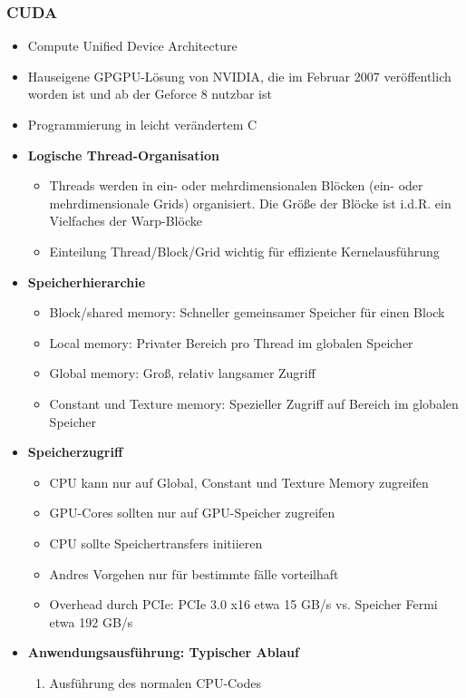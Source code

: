 \subsubsection{CUDA}
\begin{itemize}
	\item Compute Unified Device Architecture
	\item Hauseigene GPGPU-Lösung von NVIDIA, die im Februar 2007 veröffentlich worden ist und ab der Geforce 8 nutzbar ist
	\item Programmierung in leicht verändertem C
	\item \textbf{Logische Thread-Organisation}
	\begin{itemize}
		\item Threads werden in ein- oder mehrdimensionalen Blöcken (ein- oder mehrdimensionale Grids) organisiert. Die Größe der Blöcke ist i.d.R. ein Vielfaches der Warp-Blöcke
		\item Einteilung Thread/Block/Grid wichtig für effiziente Kernelausführung
	\end{itemize}
	\item \textbf{Speicherhierarchie}
	\begin{itemize}
		\item Block/shared memory: Schneller gemeinsamer Speicher für einen Block
		\item Local memory: Privater Bereich pro Thread im globalen Speicher
		\item Global memory: Groß, relativ langsamer Zugriff
		\item Constant und Texture memory: Spezieller Zugriff auf Bereich im globalen Speicher
	\end{itemize}
	\item \textbf{Speicherzugriff}
	\begin{itemize}
		\item CPU kann nur auf Global, Constant und Texture Memory zugreifen
		\item GPU-Cores sollten nur auf GPU-Speicher zugreifen
		\item CPU sollte Speichertransfers initiieren
		\item Andres Vorgehen nur für bestimmte fälle vorteilhaft
		\item Overhead durch PCIe: PCIe 3.0 x16 etwa 15 GB/s vs. Speicher Fermi etwa 192 GB/s
	\end{itemize}
	\item \textbf{Anwendungsausführung: Typischer Ablauf}
	\begin{enumerate}
		\item Ausführung des normalen CPU-Codes

\end{enumerate}
\end{itemize}
